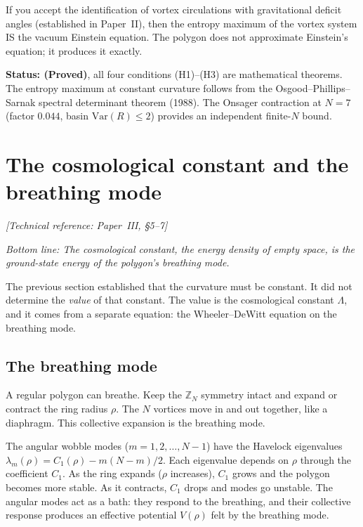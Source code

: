 If you accept the identification of vortex circulations with
gravitational deficit angles (established in Paper~II), then the entropy
maximum of the vortex system IS the vacuum Einstein equation. The
polygon does not approximate Einstein's equation; it produces it exactly.

\textbf{Status: (Proved)}, all four conditions (H1)--(H3) are
mathematical theorems. The entropy maximum at constant curvature
follows from the Osgood--Phillips--Sarnak spectral determinant
theorem (1988). The Onsager contraction at $N = 7$ (factor $0.044$,
basin $\text{Var}(R) \le 2$) provides an independent finite-$N$ bound.


\section{The cosmological constant and the breathing mode}
\noindent\textit{[Technical reference: Paper~III, \S5--7]}

\medskip

\noindent\textit{Bottom line: The cosmological constant, the energy
density of empty space, is the ground-state energy of the polygon's
breathing mode.}

\medskip

The previous section established that the curvature must be constant.
It did not determine the \emph{value} of that constant. The value is the
cosmological constant $\Lambda$, and it comes from a separate equation:
the Wheeler--DeWitt equation on the breathing mode.

\subsection*{The breathing mode}

A regular polygon can breathe. Keep the $\mathbb{Z}_N$ symmetry intact
and expand or contract the ring radius $\rho$. The $N$ vortices move in
and out together, like a diaphragm. This collective expansion is the
breathing mode.

The angular wobble modes ($m = 1, 2, \ldots, N-1$) have the Havelock
eigenvalues $\lambda_m(\rho) = C_1(\rho) - m(N-m)/2$. Each eigenvalue
depends on $\rho$ through the coefficient $C_1$. As the ring expands
($\rho$ increases), $C_1$ grows and the polygon becomes more stable. As
it contracts, $C_1$ drops and modes go unstable. The angular modes act
as a bath: they respond to the breathing, and their collective response
produces an effective potential $V(\rho)$ felt by the breathing mode.

